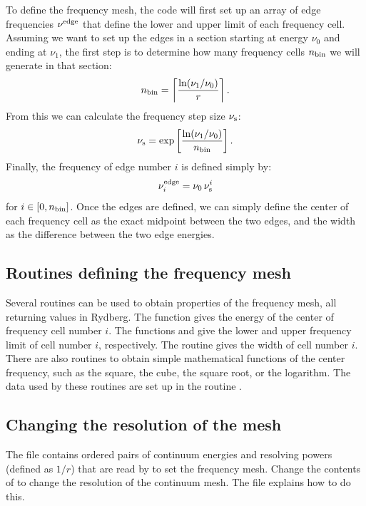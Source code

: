 To define the frequency mesh, the code will first set up an array of edge
frequencies $\nu^{\rm edge}$ that define the lower and upper limit of each
frequency cell. Assuming we want to set up the edges in a section starting at
energy $\nu_0$ and ending at $\nu_1$, the first step is to determine how many
frequency cells $n_{\rm bin}$ we will generate in that section:
\begin{equation}
  n_{\rm bin} = \left\lceil \frac{\ln(\nu_1/\nu_0)}{r} \right\rceil.
\end{equation}
From this we can calculate the frequency step size $\nu_{\rm s}$:
\begin{equation}
  \nu_{\rm s} = \exp\left[ \frac{\ln(\nu_1/\nu_0)}{n_{\rm bin}} \right].
\end{equation}
Finally, the frequency of edge number $i$ is defined simply by:
\begin{equation}
  \nu^{\rm edge}_i = \nu_0 \, \nu_{\rm s}^i
\end{equation}
for $i \in [0,n_{\rm bin}]$. Once the edges are defined, we can simply define
the center of each frequency cell as the exact midpoint between the two edges,
and the width as the difference between the two edge energies.

\subsection{Routines defining the frequency mesh}

Several routines can be used to obtain properties of the frequency mesh, all
returning values in Rydberg. The function  gives the energy
of the center of frequency cell number $i$. The functions
 and  give the lower and upper
frequency limit of cell number $i$, respectively. The routine
 gives the width of cell number $i$. There are also
routines to obtain simple mathematical functions of the center frequency, such
as the square, the cube, the square root, or the logarithm. The data used by
these routines are set up in the routine .

\subsection{Changing the resolution of the mesh}

The file  contains ordered pairs of continuum
energies and resolving powers (defined as $1/r$) that are read by
 to set the frequency mesh. Change the
contents of  to change the resolution of the
continuum mesh. The file explains how to do this.

